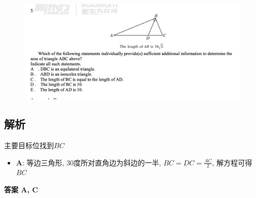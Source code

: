   \begin{figure}[H]
    \centering
    \includegraphics[width=0.7\columnwidth]{images/areas/geometry/q3}
  \end{figure}

  \subsection{解析}

    主要目标位找到$ BC $

    \begin{itemize}
      \item \textbf{A}: 等边三角形, 30度所对直角边为斜边的一半,
      $ BC = DC = \frac{AC}{2} $, 解方程可得 $ BC $
    \end{itemize}

    \textbf{答案 A, C}
